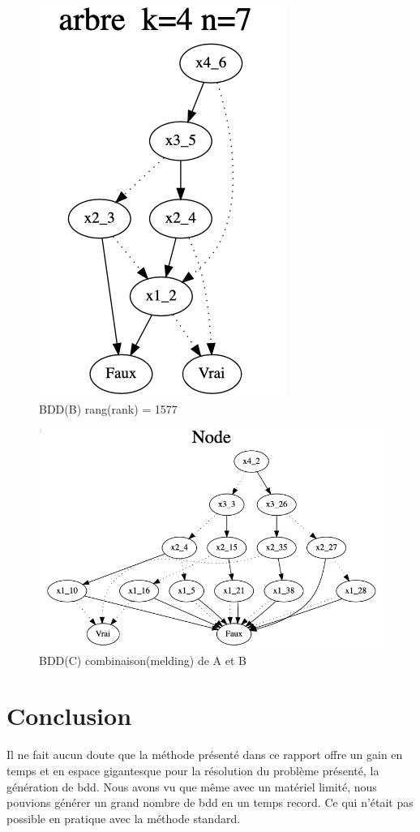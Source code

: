\documentclass[french]{article}
\begin{document}
\begin{figure}[h!]
    \centering
    \includegraphics[scale=0.4]{arb_1577.png}
    \caption{BDD(B) rang(rank) = 1577}
    \label{fig:graphe_B}
\end{figure}

\begin{figure}[h!]
    \centering
    \includegraphics[scale=0.4]{abr_melding_C.png}
    \caption{BDD(C) combinaison(melding) de A et B}
    \label{fig:graphe_C}
\end{figure}

\newpage
\section{Conclusion}
Il ne fait aucun doute que la méthode présenté dans ce rapport offre un gain en temps et en espace gigantesque pour la résolution du problème présenté, la génération de bdd. Nous avons vu que même avec un matériel limité, nous pouvions générer un grand nombre de bdd en un temps record. Ce qui n'était pas possible en pratique avec la méthode standard. 
\end{document}

